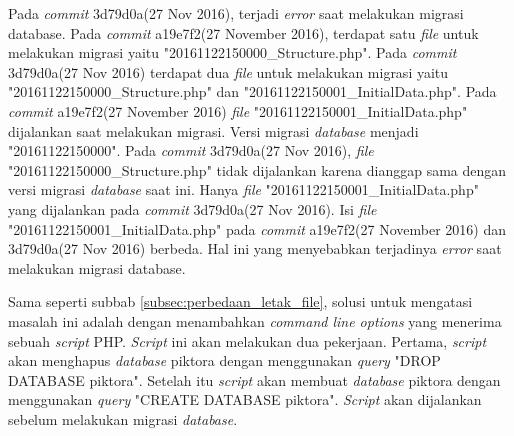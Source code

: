 Pada \textit{commit} 3d79d0a(27 Nov 2016), terjadi \textit{error} saat melakukan migrasi database. Pada \textit{commit} a19e7f2(27 November 2016), terdapat satu \textit{file} untuk melakukan migrasi yaitu "20161122150000\_Structure.php". Pada \textit{commit} 3d79d0a(27 Nov 2016) terdapat dua \textit{file} untuk melakukan migrasi yaitu "20161122150000\_Structure.php" dan "20161122150001\_InitialData.php". Pada \textit{commit} a19e7f2(27 November 2016) \textit{file} "20161122150001\_InitialData.php" dijalankan saat melakukan migrasi. Versi migrasi \textit{database} menjadi "20161122150000". Pada \textit{commit} 3d79d0a(27 Nov 2016), \textit{file} "20161122150000\_Structure.php" tidak dijalankan karena dianggap sama dengan versi migrasi \textit{database} saat ini. Hanya \textit{file} "20161122150001\_InitialData.php" yang dijalankan pada \textit{commit} 3d79d0a(27 Nov 2016). Isi \textit{file} "20161122150001\_InitialData.php" pada \textit{commit} a19e7f2(27 November 2016) dan 3d79d0a(27 Nov 2016) berbeda. Hal ini yang menyebabkan terjadinya \textit{error} saat melakukan migrasi database.  

Sama seperti subbab \ref{subsec:perbedaan_letak_file}, solusi untuk mengatasi masalah ini adalah dengan menambahkan \textit{command line options} yang menerima sebuah \textit{script} PHP. \textit{Script} ini akan melakukan dua pekerjaan. Pertama, \textit{script} akan menghapus \textit{database} piktora dengan menggunakan \textit{query} "DROP DATABASE piktora". Setelah itu \textit{script} akan membuat \textit{database} piktora dengan menggunakan \textit{query} "CREATE DATABASE piktora". \textit{Script} akan dijalankan sebelum melakukan migrasi \textit{database}. 

